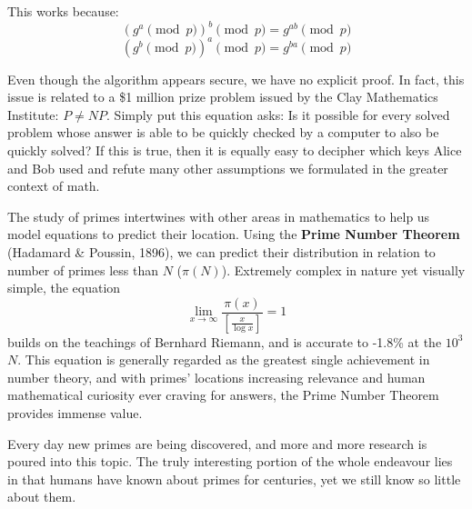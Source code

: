 This works because:
\[{(g^a \pmod{p})}^b \pmod{p} = g^{ab} \pmod{p}\]
\[{(g^b \pmod{p})}^a \pmod{p} = g^{ba} \pmod{p}\]

Even though the algorithm appears secure, we have no explicit proof. In fact, this issue is related to a \$1 million prize problem issued by the Clay Mathematics Institute: \(P \neq NP\). Simply put this equation asks: Is it possible for every solved problem whose answer is able to be quickly checked by a computer to also be quickly solved? If this is true, then it is equally easy to decipher which keys Alice and Bob used and refute many other assumptions we formulated in the greater context of math.

The study of primes intertwines with other areas in mathematics to help us model equations to predict their location. Using the \textbf{Prime Number Theorem} (Hadamard \& Poussin, 1896), we can predict their distribution in relation to number of primes less than \(N\) (\(\pi(N)\)). Extremely complex in nature yet visually simple, the equation
\[
\lim_{x\to\infty} \frac{\pi(x)}{[\frac{x}{\log{x}}]} = 1    
\]
builds on the teachings of Bernhard Riemann, and is accurate to -1.8\% at the \(10^3\) \(N\). This equation is generally regarded as the greatest single achievement in number theory, and with primes’ locations increasing relevance and human mathematical curiosity ever craving for answers, the Prime Number Theorem provides immense value. 

Every day new primes are being discovered, and more and more research is poured into this topic. The truly interesting portion of the whole endeavour lies in that humans have known about primes for centuries, yet we still know so little about them. 
